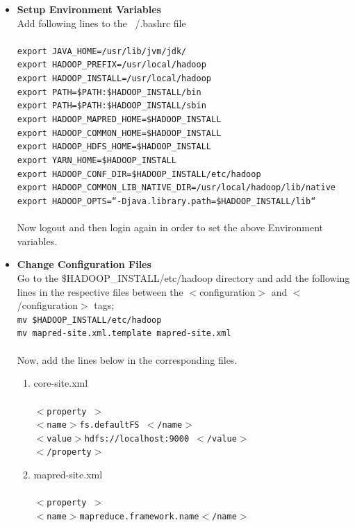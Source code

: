 \documentclass[12pt]{book}
\newcommand{\shellcmd}[1]{\\\indent\texttt{\footnotesize #1}\\}
\begin{document}
\begin{itemize}
\item \textbf{Setup Environment Variables}\\
Add following lines to the ~/.bashrc file\\
\shellcmd{export JAVA\_HOME=/usr/lib/jvm/jdk/\\
	  export HADOOP\_PREFIX=/usr/local/hadoop\\
	  export HADOOP\_INSTALL=/usr/local/hadoop\\
	  export PATH=\$PATH:\$HADOOP\_INSTALL/bin\\
	  export PATH=\$PATH:\$HADOOP\_INSTALL/sbin\\
	  export HADOOP\_MAPRED\_HOME=\$HADOOP\_INSTALL\\
	  export HADOOP\_COMMON\_HOME=\$HADOOP\_INSTALL\\
	  export HADOOP\_HDFS\_HOME=\$HADOOP\_INSTALL\\
	  export YARN\_HOME=\$HADOOP\_INSTALL\\
	  export HADOOP\_CONF\_DIR=\$HADOOP\_INSTALL/etc/hadoop\\
	  export HADOOP\_COMMON\_LIB\_NATIVE\_DIR=/usr/local/hadoop/lib/native\\
	  export HADOOP\_OPTS=``-Djava.library.path=\$HADOOP\_INSTALL/lib``  
	  }\\
Now logout and then login again in order to set the above Environment variables.
\item \textbf{Change Configuration Files}\\
Go to the \$HADOOP\_INSTALL/etc/hadoop directory and add the following lines in the respective files between the
$<$configuration$>$ and $<$/configuration$>$ tags;
\shellcmd{mv \$HADOOP\_INSTALL/etc/hadoop\\
	  mv mapred-site.xml.template mapred-site.xml\\
}
Now, add the lines below in the corresponding files.
\begin{enumerate}
 \item core-site.xml\\
 \shellcmd{$<$property $>$\\
	    $<$name$>$fs.defaultFS $<$/name$>$ \\
	    $<$value$>$hdfs://localhost:9000 $<$/value$>$\\
	    $<$/property$>$
          }
 \item mapred-site.xml\\
 \shellcmd{$<$property $>$\\
                $<$name$>$mapreduce.framework.name$<$/name$>$ \\
}
\end{enumerate}
\end{itemize}
\end{document}
